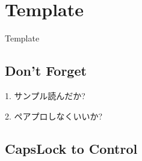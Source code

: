 \section{Template}

Template


\subsection{Don't Forget}

1. サンプル読んだか?

2. ペアプロしなくいいか?

\subsection{CapsLock to Control}

